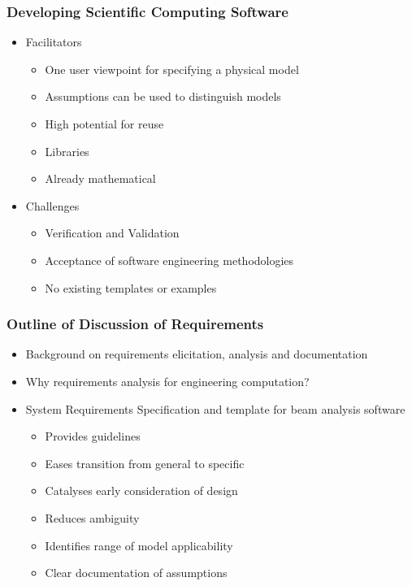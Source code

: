 \documentclass[t,12pt,numbers,fleqn]{beamer}
\begin{document}

\begin{frame}

\frametitle{Developing Scientific Computing Software}

\begin{itemize}

\item Facilitators
\begin{itemize}
\item One user viewpoint for specifying a physical model
\item Assumptions can be used to distinguish models
\item High potential for reuse
\item Libraries
\item Already mathematical
\end{itemize}

\item Challenges
\begin{itemize}
\item Verification and Validation
\item Acceptance of software engineering methodologies
\item No existing templates or examples %
\end{itemize}

\end{itemize}

\end{frame}


\begin{frame}
\frametitle{Outline of Discussion of Requirements}

\begin{itemize}

\item Background on requirements elicitation, analysis and documentation
\item Why requirements analysis for engineering computation?

\item System Requirements Specification and template for beam analysis software
\begin{itemize}
\item Provides guidelines
\item Eases transition from general to specific
\item Catalyses early consideration of design
\item Reduces ambiguity
\item Identifies range of model applicability
\item Clear documentation of assumptions
\end{itemize}

\end{itemize}
\end{frame}
\end{document}
